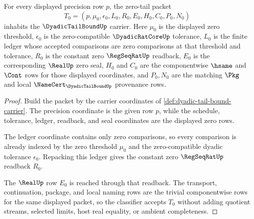 \begin{theorem}
\label{thm:dyadic-tail-bound-zero-tail-carrier-habitation}
For every displayed precision row $p$, the zero-tail packet
$$
T_0=(p,\mu_0,\epsilon_0,L_0,R_0,E_0,H_0,C_0,P_0,N_0)
$$
inhabits the $\DyadicTailBoundUp$ carrier. Here $\mu_0$ is the displayed zero threshold, $\epsilon_0$ is the zero-compatible $\DyadicRatCoreUp$ tolerance, $L_0$ is the finite ledger whose accepted comparisons are zero comparisons at that threshold and tolerance, $R_0$ is the constant zero $\RegSeqRatUp$ readback, $E_0$ is the corresponding $\RealUp$ zero seal, $H_0$ and $C_0$ are the componentwise $\hsame$ and $\Cont$ rows for those displayed coordinates, and $P_0,N_0$ are the matching $\Pkg$ and local $\NameCert_{\DyadicTailBoundUp}$ provenance rows.
\end{theorem}
\begin{proof}
Build the packet by the carrier coordinates of \autoref{def:dyadic-tail-bound-carrier}. The precision coordinate is the given row $p$, while the schedule, tolerance, ledger, readback, and seal coordinates are the displayed zero rows.

The ledger coordinate contains only zero comparisons, so every comparison is already indexed by the zero threshold $\mu_0$ and the zero-compatible dyadic tolerance $\epsilon_0$. Repacking this ledger gives the constant zero $\RegSeqRatUp$ readback $R_0$.

The $\RealUp$ row $E_0$ is reached through that readback. The transport, continuation, package, and local naming rows are the trivial componentwise rows for the same displayed packet, so the classifier accepts $T_0$ without adding quotient streams, selected limits, host real equality, or ambient completeness.
\end{proof}

